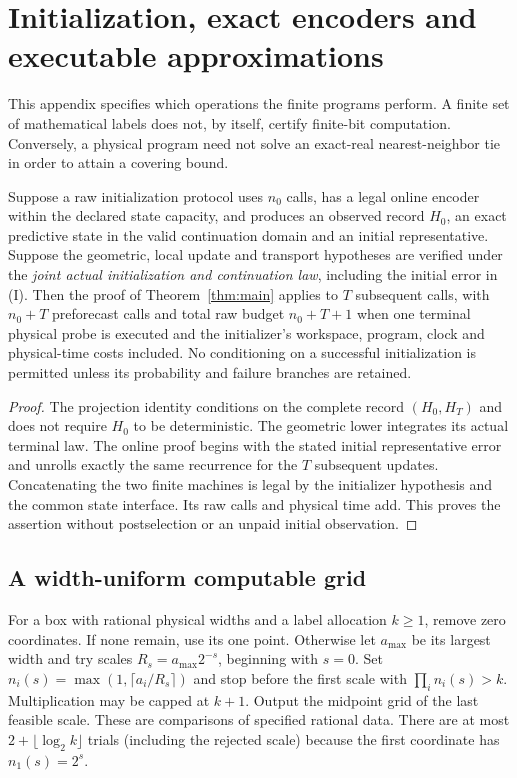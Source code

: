 \section{Initialization, exact encoders and executable approximations}\label{sec:algorithms}
This appendix specifies which operations the finite programs perform. A finite set of mathematical labels does not, by itself, certify finite-bit computation. Conversely, a physical program need not solve an exact-real nearest-neighbor tie in order to attain a covering bound.

\begin{lemma}\label{lem:initialization}
Suppose a raw initialization protocol uses $n_0$ calls, has a legal online encoder within the declared state capacity, and produces an observed record $H_0$, an exact predictive state in the valid continuation domain and an initial representative. Suppose the geometric, local update and transport hypotheses are verified under the \emph{joint actual initialization and continuation law}, including the initial error in \textup{(I)}. Then the proof of Theorem~\ref{thm:main} applies to $T$ subsequent calls, with $n_0+T$ preforecast calls and total raw budget $n_0+T+1$ when one terminal physical probe is executed and the initializer's workspace, program, clock and physical-time costs included. No conditioning on a successful initialization is permitted unless its probability and failure branches are retained.
\end{lemma}
\begin{proof}
The projection identity conditions on the complete record $(H_0,H_T)$ and does not require $H_0$ to be deterministic. The geometric lower integrates its actual terminal law. The online proof begins with the stated initial representative error and unrolls exactly the same recurrence for the $T$ subsequent updates. Concatenating the two finite machines is legal by the initializer hypothesis and the common state interface. Its raw calls and physical time add. This proves the assertion without postselection or an unpaid initial observation.
\end{proof}

\subsection{A width-uniform computable grid}
For a box with rational physical widths and a label allocation $k\ge1$, remove zero coordinates. If none remain, use its one point. Otherwise let $a_{\max}$ be its largest width and try scales $R_s=a_{\max}2^{-s}$, beginning with $s=0$. Set $n_i(s)=\max(1,\lceil a_i/R_s\rceil)$ and stop before the first scale with $\prod_i n_i(s)>k$. Multiplication may be capped at $k+1$. Output the midpoint grid of the last feasible scale. These are comparisons of specified rational data. There are at most $2+\lfloor\log_2 k\rfloor$ trials (including the rejected scale) because the first coordinate has $n_1(s)=2^s$.

